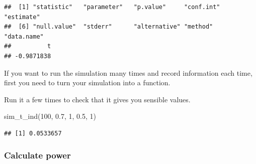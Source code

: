 \documentclass[
  oneside]{book}
\newenvironment{Shaded}{\begin{snugshade}}{\end{snugshade}}
\newcommand{\AttributeTok}[1]{\textcolor[rgb]{0.77,0.63,0.00}{#1}}
\newcommand{\CommentTok}[1]{\textcolor[rgb]{0.56,0.35,0.01}{\textit{#1}}}
\newcommand{\ConstantTok}[1]{\textcolor[rgb]{0.00,0.00,0.00}{#1}}
\newcommand{\ControlFlowTok}[1]{\textcolor[rgb]{0.13,0.29,0.53}{\textbf{#1}}}
\newcommand{\DecValTok}[1]{\textcolor[rgb]{0.00,0.00,0.81}{#1}}
\newcommand{\FloatTok}[1]{\textcolor[rgb]{0.00,0.00,0.81}{#1}}
\newcommand{\FunctionTok}[1]{\textcolor[rgb]{0.00,0.00,0.00}{#1}}
\newcommand{\NormalTok}[1]{#1}
\newcommand{\OtherTok}[1]{\textcolor[rgb]{0.56,0.35,0.01}{#1}}
\newcommand{\SpecialCharTok}[1]{\textcolor[rgb]{0.00,0.00,0.00}{#1}}
\begin{document}
\begin{verbatim}
##  [1] "statistic"   "parameter"   "p.value"     "conf.int"    "estimate"   
##  [6] "null.value"  "stderr"      "alternative" "method"      "data.name"  
##          t 
## -0.9871838
\end{verbatim}

If you want to run the simulation many times and record information each time, first you need to turn your simulation into a function.

\begin{Shaded}
\end{Shaded}

Run it a few times to check that it gives you sensible values.

\begin{Shaded}
\begin{Highlighting}[]
\FunctionTok{sim\_t\_ind}\NormalTok{(}\DecValTok{100}\NormalTok{, }\FloatTok{0.7}\NormalTok{, }\DecValTok{1}\NormalTok{, }\FloatTok{0.5}\NormalTok{, }\DecValTok{1}\NormalTok{)}
\end{Highlighting}
\end{Shaded}

\begin{verbatim}
## [1] 0.0533657
\end{verbatim}

\hypertarget{calc-power-t}{%
\subsubsection{Calculate power}\label{calc-power-t}}
\end{document}
